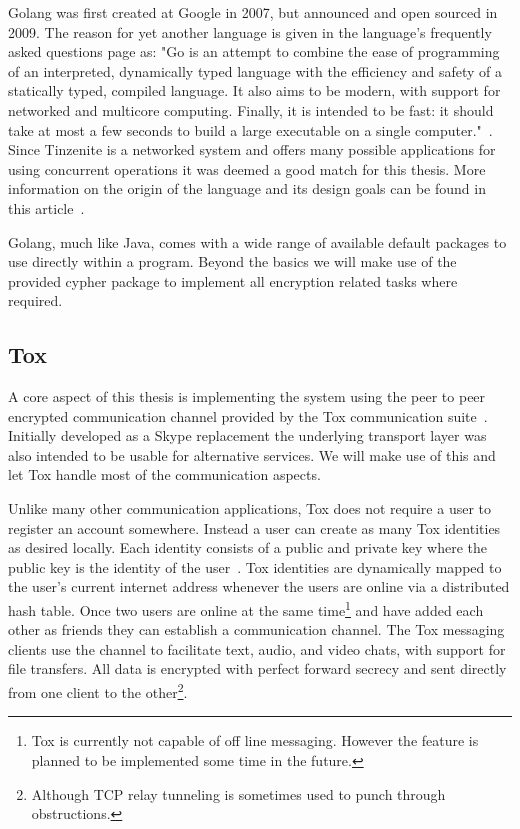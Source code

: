 Golang was first created at Google in 2007, but announced and open sourced in 2009.
The reason for yet another language is given in the language's frequently asked questions page as: "Go is an attempt to combine the ease of programming of an interpreted, dynamically typed language with the efficiency and safety of a statically typed, compiled language. It also aims to be modern, with support for networked and multicore computing. Finally, it is intended to be fast: it should take at most a few seconds to build a large executable on a single computer."~\cite{web:site:golang:faq}.
Since Tinzenite is a networked system and offers many possible applications for using concurrent operations it was deemed a good match for this thesis.
More information on the origin of the language and its design goals can be found in this article~\cite{pike2012go}.

Golang, much like Java, comes with a wide range of available default packages to use directly within a program.
Beyond the basics we will make use of the provided cypher package to implement all encryption related tasks where required.

\subsection{Tox}
\label{sub:Tox}

A core aspect of this thesis is implementing the system using the peer to peer encrypted communication channel provided by the Tox communication suite~\cite{web:site:tox}.
Initially developed as a Skype replacement the underlying transport layer was also intended to be usable for alternative services.
We will make use of this and let Tox handle most of the communication aspects.

Unlike many other communication applications, Tox does not require a user to register an account somewhere.
Instead a user can create as many Tox identities as desired locally.
Each identity consists of a public and private key where the public key is the identity of the user~\cite{web:site:tox:crypto}.
Tox identities are dynamically mapped to the user's current internet address whenever the users are online via a distributed hash table.
Once two users are online at the same time\footnote{Tox is currently not capable of off line messaging. However the feature is planned to be implemented some time in the future.} and have added each other as friends they can establish a communication channel.
The Tox messaging clients use the channel to facilitate text, audio, and video chats, with support for file transfers.
All data is encrypted with perfect forward secrecy and sent directly from one client to the other\footnote{Although TCP relay tunneling is sometimes used to punch through obstructions.}.

